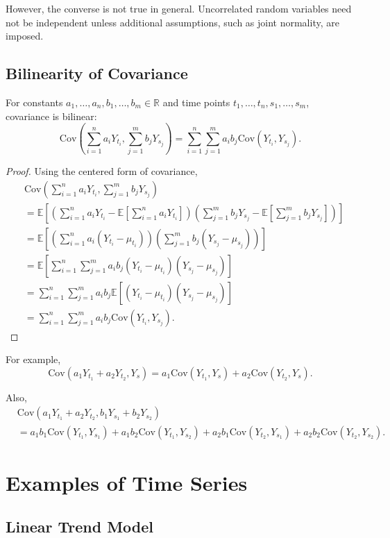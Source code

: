 \documentclass[12pt,oneside]{book}
\numberwithin{equation}{section}
\theoremstyle{definition}
\theoremstyle{plain}
\theoremstyle{remark}
\newcommand{\R}{\mathbb{R}}
\newcommand{\E}{\mathbb{E}}
\newcommand{\Cov}{\mathrm{Cov}}
\begin{document}
However, the converse is not true in general. Uncorrelated random variables need not be independent unless additional assumptions, such as joint normality, are imposed.

\subsection*{Bilinearity of Covariance}

For constants $a_1,\ldots,a_n,b_1,\ldots,b_m \in \R$ and time points $t_1,\ldots,t_n,s_1,\ldots,s_m$, covariance is bilinear:
\[
\Cov\left(\sum_{i=1}^n a_iY_{t_i},\sum_{j=1}^m b_jY_{s_j}\right)
=
\sum_{i=1}^n\sum_{j=1}^m a_ib_j\Cov(Y_{t_i},Y_{s_j}).
\]

\begin{proof}
Using the centered form of covariance,
\begin{align*}
&\Cov\left(\sum_{i=1}^n a_iY_{t_i},\sum_{j=1}^m b_jY_{s_j}\right) \\
&=
\E\left[
\left(
\sum_{i=1}^n a_iY_{t_i}
-
\E\left[\sum_{i=1}^n a_iY_{t_i}\right]
\right)
\left(
\sum_{j=1}^m b_jY_{s_j}
-
\E\left[\sum_{j=1}^m b_jY_{s_j}\right]
\right)
\right] \\
&=
\E\left[
\left(
\sum_{i=1}^n a_i(Y_{t_i}-\mu_{t_i})
\right)
\left(
\sum_{j=1}^m b_j(Y_{s_j}-\mu_{s_j})
\right)
\right] \\
&=
\E\left[
\sum_{i=1}^n\sum_{j=1}^m
a_ib_j(Y_{t_i}-\mu_{t_i})(Y_{s_j}-\mu_{s_j})
\right] \\
&=
\sum_{i=1}^n\sum_{j=1}^m
a_ib_j\E[(Y_{t_i}-\mu_{t_i})(Y_{s_j}-\mu_{s_j})] \\
&=
\sum_{i=1}^n\sum_{j=1}^m
a_ib_j\Cov(Y_{t_i},Y_{s_j}).
\end{align*}
\end{proof}

For example,
\[
\Cov(a_1Y_{t_1}+a_2Y_{t_2},Y_s)
=
a_1\Cov(Y_{t_1},Y_s)+a_2\Cov(Y_{t_2},Y_s).
\]

Also,
\begin{align*}
&\Cov(a_1Y_{t_1}+a_2Y_{t_2},b_1Y_{s_1}+b_2Y_{s_2}) \\
&=
a_1b_1\Cov(Y_{t_1},Y_{s_1})
+
a_1b_2\Cov(Y_{t_1},Y_{s_2})
+
a_2b_1\Cov(Y_{t_2},Y_{s_1})
+
a_2b_2\Cov(Y_{t_2},Y_{s_2}).
\end{align*}

\section{Examples of Time Series}

\subsection*{Linear Trend Model}
\end{document}
